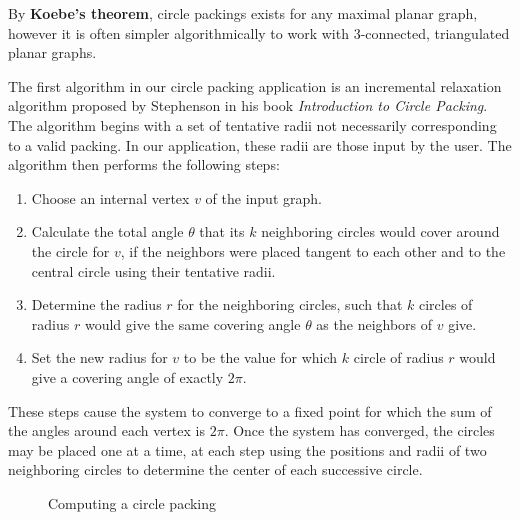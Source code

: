 \documentclass[11pt]{article}
\theoremstyle{definition}
\begin{document}
	By \textbf{Koebe's theorem}, circle packings exists for any maximal planar graph, however it is often simpler algorithmically to work with 3-connected, triangulated planar graphs.

	The first algorithm in our circle packing application is an incremental relaxation algorithm proposed by Stephenson in his book \emph{Introduction to Circle Packing}. 
	The algorithm begins with a set of tentative radii not necessarily corresponding to a valid packing. In our application, these radii are those input by the user. 
	The algorithm then performs the following steps:
	
	\begin{enumerate}
		\item Choose an internal vertex $v$ of the input graph.
		\item Calculate the total angle $\theta$ that its $k$ neighboring circles would cover around the circle for $v$, if the neighbors were placed tangent to each other and to the central circle using their tentative radii.
		\item Determine the radius $r$ for the neighboring circles, such that $k$ circles of radius $r$ would give the same covering angle $\theta$ as the neighbors of $v$ give.
		\item Set the new radius for $v$ to be the value for which $k$ circle of radius $r$ would give a covering angle of exactly $2\pi$.
	\end{enumerate}
	
	These steps cause the system to converge to a fixed point for which the sum of the angles around each vertex is $2\pi$. 
	Once the system has converged, the circles may be placed one at a time, at each step using the positions and radii of two neighboring circles to determine the center of each successive circle.

	\begin{figure}[H]%
    		\centering
    		\qquad
    		\caption{Computing a circle packing}%
    		\label{fig:inout}%
	\end{figure}
\end{document}
